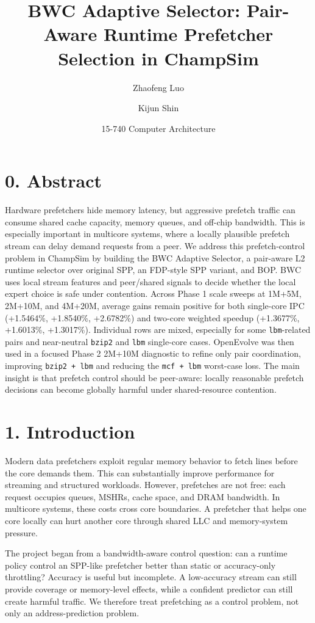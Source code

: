 \documentclass[10pt,letterpaper]{article}
\title{\vspace{-2.5em}\textbf{BWC Adaptive Selector: Pair-Aware Runtime Prefetcher Selection in ChampSim}}
\author{Zhaofeng Luo \and Kijun Shin}
\date{15-740 Computer Architecture}
\newcommand{\pct}[1]{#1\%}
\newcommand{\code}[1]{\texttt{#1}}
\begin{document}
\maketitle
\vspace{-1.4em}

\section*{0. Abstract}

Hardware prefetchers hide memory latency, but aggressive prefetch traffic can
consume shared cache capacity, memory queues, and off-chip bandwidth. This is
especially important in multicore systems, where a locally plausible prefetch
stream can delay demand requests from a peer. We address this prefetch-control
problem in ChampSim by building the BWC Adaptive Selector, a pair-aware L2
runtime selector over original SPP, an FDP-style SPP variant, and BOP. BWC uses
local stream features and peer/shared signals to decide whether the local expert
choice is safe under contention. Across Phase 1 scale sweeps at 1M+5M,
2M+10M, and 4M+20M, average gains remain positive for both single-core IPC
(\pct{+1.5464}, \pct{+1.8540}, \pct{+2.6782}) and two-core weighted speedup
(\pct{+1.3677}, \pct{+1.6013}, \pct{+1.3017}). Individual rows are mixed,
especially for some \code{lbm}-related pairs and near-neutral \code{bzip2} and
\code{lbm} single-core cases. OpenEvolve was then used in a focused Phase 2
2M+10M diagnostic to refine only pair coordination, improving
\code{bzip2 + lbm} and reducing the \code{mcf + lbm} worst-case loss. The main
insight is that prefetch control should be peer-aware: locally reasonable
prefetch decisions can become globally harmful under shared-resource contention.

\section*{1. Introduction}

Modern data prefetchers exploit regular memory behavior to fetch lines before
the core demands them. This can substantially improve performance for streaming
and structured workloads. However, prefetches are not free: each request
occupies queues, MSHRs, cache space, and DRAM bandwidth. In multicore systems,
these costs cross core boundaries. A prefetcher that helps one core locally can
hurt another core through shared LLC and memory-system pressure.

The project began from a bandwidth-aware control question: can a runtime policy
control an SPP-like prefetcher better than static or accuracy-only throttling?
Accuracy is useful but incomplete. A low-accuracy stream can still provide
coverage or memory-level effects, while a confident predictor can still create
harmful traffic. We therefore treat prefetching as a control problem, not only
an address-prediction problem.
\end{document}
